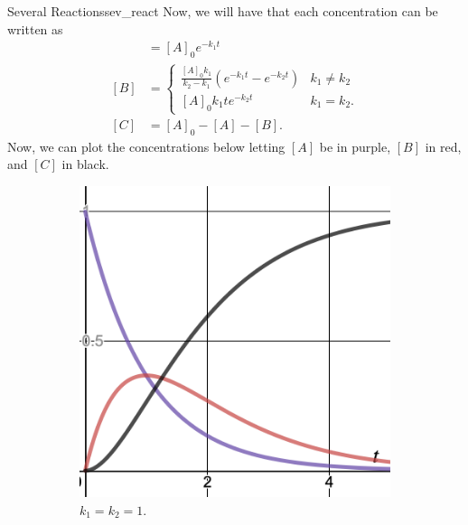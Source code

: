 \begin{ex}{Several Reactions}{sev_react}
        Now, we will have that each concentration can be written as
        \begin{align*}
            [A]&=[A]_0e^{-k_1t}\\
            [B]&=\begin{cases}
        \frac{[A]_0k_1}{k_2-k_1}\left( e^{-k_1t}-e^{-k_2t}\right) & k_1\neq k_2\\
        [A]_0k_1te^{-k_2t} & k_1=k_2.
        \end{cases}\\
        [C]&=[A]_0-[A]-[B].
        \end{align*}
        Now, we can plot the concentrations below letting $[A]$ be in purple, $[B]$ in red, and $[C]$ in black.
        \begin{figure}[H]
    \centering
    \begin{subfigure}[h]{0.3\textwidth}
        \includegraphics[width=\textwidth]{Figures_Part_2/k1=k2.png}
        \caption{$k_1=k_2=1$.}
    \end{subfigure}
    ~
    \begin{subfigure}[h]{0.3\textwidth}

\end{subfigure}
\end{figure}
\end{ex}

